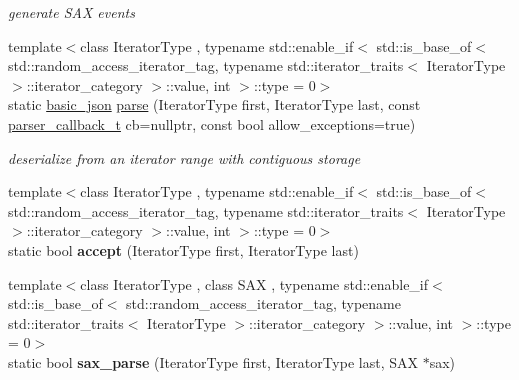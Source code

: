 \begin{DoxyCompactItemize}
\begin{DoxyCompactList}\small\item\em generate S\+AX events \end{DoxyCompactList}\item 
{\footnotesize template$<$class Iterator\+Type , typename std\+::enable\+\_\+if$<$ std\+::is\+\_\+base\+\_\+of$<$ std\+::random\+\_\+access\+\_\+iterator\+\_\+tag, typename std\+::iterator\+\_\+traits$<$ Iterator\+Type $>$\+::iterator\+\_\+category $>$\+::value, int $>$\+::type  = 0$>$ }\\static \mbox{\hyperlink{classnlohmann_1_1basic__json}{basic\+\_\+json}} \mbox{\hyperlink{classnlohmann_1_1basic__json_ab330c13ba254ea41fbc1c52c5c610f45}{parse}} (Iterator\+Type first, Iterator\+Type last, const \mbox{\hyperlink{classnlohmann_1_1basic__json_ab4f78c5f9fd25172eeec84482e03f5b7}{parser\+\_\+callback\+\_\+t}} cb=nullptr, const bool allow\+\_\+exceptions=true)
\begin{DoxyCompactList}\small\item\em deserialize from an iterator range with contiguous storage \end{DoxyCompactList}\item 
\mbox{\label{classnlohmann_1_1basic__json_ae797958b922732bf5fc01053d0659c1f}} 
{\footnotesize template$<$class Iterator\+Type , typename std\+::enable\+\_\+if$<$ std\+::is\+\_\+base\+\_\+of$<$ std\+::random\+\_\+access\+\_\+iterator\+\_\+tag, typename std\+::iterator\+\_\+traits$<$ Iterator\+Type $>$\+::iterator\+\_\+category $>$\+::value, int $>$\+::type  = 0$>$ }\\static bool {\bfseries accept} (Iterator\+Type first, Iterator\+Type last)
\item 
\mbox{\label{classnlohmann_1_1basic__json_aab9d7f0843a6e8f18eb2ebb944a796bd}} 
{\footnotesize template$<$class Iterator\+Type , class S\+AX , typename std\+::enable\+\_\+if$<$ std\+::is\+\_\+base\+\_\+of$<$ std\+::random\+\_\+access\+\_\+iterator\+\_\+tag, typename std\+::iterator\+\_\+traits$<$ Iterator\+Type $>$\+::iterator\+\_\+category $>$\+::value, int $>$\+::type  = 0$>$ }\\static bool {\bfseries sax\+\_\+parse} (Iterator\+Type first, Iterator\+Type last, S\+AX $\ast$sax)
\end{DoxyCompactItemize}

